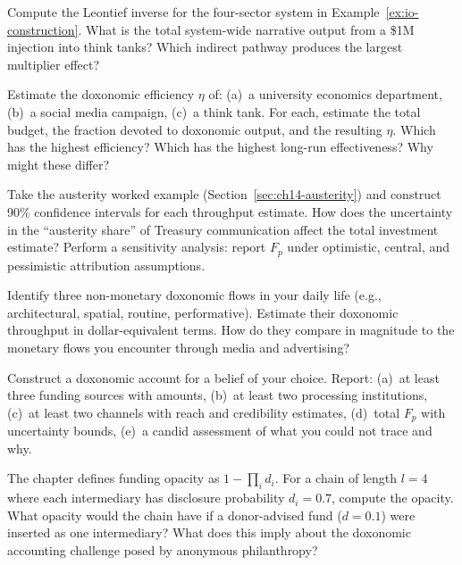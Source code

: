 \begin{exercise}
Compute the Leontief inverse for the four-sector system in Example~\ref{ex:io-construction}.
What is the total system-wide narrative output from a \$1M injection into think tanks?
Which indirect pathway produces the largest multiplier effect?
\end{exercise}

\begin{exercise}
Estimate the doxonomic efficiency $\eta$ of: (a)~a university economics department, (b)~a social media campaign, (c)~a think tank.
For each, estimate the total budget, the fraction devoted to doxonomic output, and the resulting $\eta$.
Which has the highest efficiency?
Which has the highest long-run effectiveness?
Why might these differ?
\end{exercise}

\begin{exercise}
\label{ex:ch14-uncertainty}
Take the austerity worked example (Section~\ref{sec:ch14-austerity}) and construct 90\% confidence intervals for each throughput estimate.
How does the uncertainty in the ``austerity share'' of Treasury communication affect the total investment estimate?
Perform a sensitivity analysis: report $F_p$ under optimistic, central, and pessimistic attribution assumptions.
\end{exercise}

\begin{exercise}
\label{ex:ch14-nonmonetary}
Identify three non-monetary doxonomic flows in your daily life (e.g., architectural, spatial, routine, performative).
Estimate their doxonomic throughput in dollar-equivalent terms.
How do they compare in magnitude to the monetary flows you encounter through media and advertising?
\end{exercise}

\begin{exercise}
Construct a doxonomic account for a belief of your choice.
Report: (a)~at least three funding sources with amounts, (b)~at least two processing institutions, (c)~at least two channels with reach and credibility estimates, (d)~total $F_p$ with uncertainty bounds, (e)~a candid assessment of what you could not trace and why.
\end{exercise}

\begin{exercise}
\label{ex:ch14-opacity}
The chapter defines funding opacity as $1 - \prod_i d_i$.
For a chain of length $l = 4$ where each intermediary has disclosure probability $d_i = 0.7$, compute the opacity.
What opacity would the chain have if a donor-advised fund ($d = 0.1$) were inserted as one intermediary?
What does this imply about the doxonomic accounting challenge posed by anonymous philanthropy?
\end{exercise}
